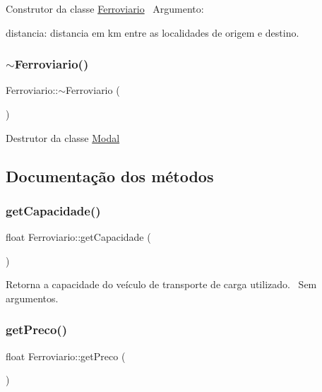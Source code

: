 Construtor da classe \hyperlink{classFerroviario}{Ferroviario}~\newline
 Argumento\+:
\begin{DoxyItemize}
\item distancia\+: distancia em km entre as localidades de origem e destino.
\end{DoxyItemize}\mbox{\label{classFerroviario_a14356b699e7cd2651654ef06029d2f0d}} 
\subsubsection{\texorpdfstring{$\sim$\+Ferroviario()}{~Ferroviario()}}
{\footnotesize\ttfamily Ferroviario\+::$\sim$\+Ferroviario (\begin{DoxyParamCaption}{ }\end{DoxyParamCaption})}

Destrutor da classe \hyperlink{classModal}{Modal}

\subsection{Documentação dos métodos}
\mbox{\label{classFerroviario_a990ce4dac67327abd75d66f94bf5d358}} 
\subsubsection{\texorpdfstring{get\+Capacidade()}{getCapacidade()}}
{\footnotesize\ttfamily float Ferroviario\+::get\+Capacidade (\begin{DoxyParamCaption}{ }\end{DoxyParamCaption})}

Retorna a capacidade do veículo de transporte de carga utilizado.~\newline
Sem argumentos.\mbox{\label{classFerroviario_a2face4e080b96591614237d88bda094c}} 
\subsubsection{\texorpdfstring{get\+Preco()}{getPreco()}}
{\footnotesize\ttfamily float Ferroviario\+::get\+Preco (\begin{DoxyParamCaption}{ }\end{DoxyParamCaption})}

